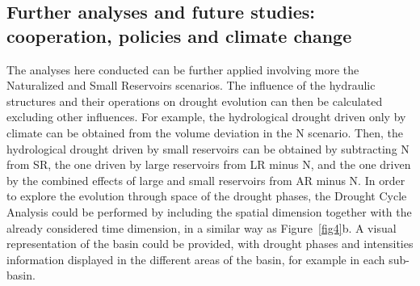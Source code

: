 \documentclass[draft]{agujournal2019}
\begin{document}
\subsection{Further analyses and future studies: cooperation, policies and climate change}
The analyses here conducted can be further applied involving more the Naturalized and Small Reservoirs scenarios. The influence of the hydraulic structures and their operations on drought evolution can then be calculated excluding other influences. For example, the hydrological drought driven only by climate can be obtained from the volume deviation in the N scenario. Then, the hydrological drought driven by small reservoirs can be obtained by subtracting N from SR, the one driven by large reservoirs from LR minus N, and the one driven by the combined effects of large and small reservoirs from AR minus N. In order to explore the evolution through space of the drought phases, the Drought Cycle Analysis could be performed by including the spatial dimension together with the already considered time dimension, in a similar way as Figure~\ref{fig4}b. A visual representation of the basin could be provided, with drought phases and intensities information displayed in the different areas of the basin, for example in each sub-basin.\\
\end{document}
